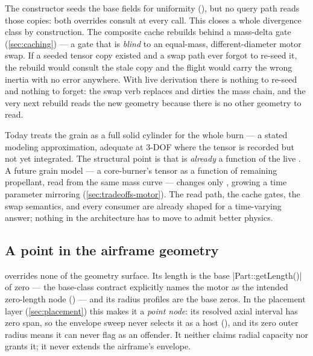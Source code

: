 \begin{keyinsight}
The constructor seeds the  base fields for uniformity
(), but no query path reads those copies: both overrides
consult  at every call. This closes a whole divergence class by construction. The
composite cache rebuilds behind a mass-delta gate (\cref{sec:caching}) --- a gate that is
\emph{blind} to an equal-mass, different-diameter motor swap. If a seeded tensor copy existed and
a swap path ever forgot to re-seed it, the rebuild would consult the stale copy and the flight
would carry the wrong inertia with no error anywhere. With live derivation there is nothing to
re-seed and nothing to forget: the swap verb replaces  and dirties the mass chain, and
the very next rebuild reads the new geometry because there is no other geometry to read.
\end{keyinsight}

\begin{designrule}
Today  treats the grain as a full solid cylinder for the whole burn --- a stated
modeling approximation, adequate at 3-DOF where the tensor is recorded but not yet integrated. The
structural point is that  is \emph{already} a function of the live .
A future grain model --- a core-burner's tensor as a function of remaining propellant, read from
the same mass curve --- changes only , growing  a time parameter
mirroring  (\cref{sec:tradeoffs-motor}). The read path, the
cache gates, the swap semantics, and every consumer are already shaped for a time-varying answer;
nothing in the architecture has to move to admit better physics.
\end{designrule}

\subsection{A point in the airframe geometry}\label{sec:motor-point}

 overrides none of the geometry surface. Its length is the base
\cppinline|Part::getLength()| of zero --- the base-class contract explicitly names the motor as the
intended zero-length node () --- and its radius profiles are the
base zeros. In the placement layer (\cref{sec:placement}) this makes it a \emph{point node}: its
resolved axial interval has zero span, so the envelope sweep never selects it as a host
(), and its zero outer radius means it can never flag as
an offender. It neither claims radial capacity nor grants it; it never extends the airframe's
envelope.


